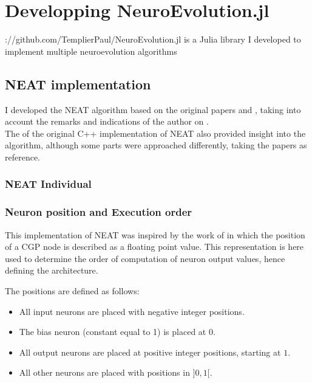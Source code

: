 \chapter{Developping NeuroEvolution.jl}
\label{sec:neuroevo}

\hrefhttps://github.com/TemplierPaul/NeuroEvolution.jl{}{\color{blue}{NeuroEvolution.jl}} is a Julia library I developed to implement multiple neuroevolution algorithms

\section{NEAT implementation}

I developed the NEAT algorithm based on the original papers \cite{NEAT_1} and \cite{NEAT_2}, taking into account the remarks and indications of the author on \href{https://www.cs.ucf.edu/~kstanley/neat.html#FAQ2}{
\color{blue}{his website}}. \\
The \href{https://github.com/FernandoTorres/NEAT}{\color{blue}{reorganized version}} of the original C++ implementation of NEAT also provided insight into the algorithm, although some parts were approached differently, taking the papers as reference.   

\subsection{NEAT Individual}

\subsection{Neuron position and Execution order}
This implementation of NEAT was inspired by the work of \cite{wilson2018positionalcgp} in which the position of a CGP node is described as a floating point value. This representation is here used to determine the order of computation of neuron output values, hence defining the architecture.  

The positions are defined as follows:
\begin{itemize}
    \item All input neurons are placed with negative integer positions.  
    \item The bias neuron (constant equal to 1) is placed at $0$.  
    \item All output neurons are placed at positive integer positions, starting at $1$.
    \item All other neurons are placed with positions in $]0, 1[$.
\end{itemize}

